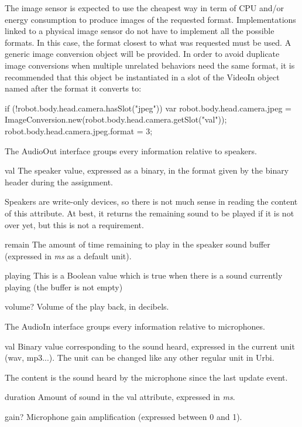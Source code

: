 The image sensor is expected to use the cheapest way in term of CPU and/or
energy consumption to produce images of the requested format.
Implementations linked to a physical image sensor do not have to implement
all the possible formats. In this case, the format closest to what was
requested must be used.  A generic image conversion object will be
provided. In order to avoid duplicate image conversions when multiple
unrelated behaviors need the same format, it is recommended that this object
be instantiated in a slot of the VideoIn object named after the format it
converts to:
\begin{urbiunchecked}
if (!robot.body.head.camera.hasSlot("jpeg"))
{
  var robot.body.head.camera.jpeg =
    ImageConversion.new(robot.body.head.camera.getSlot("val"));
  robot.body.head.camera.jpeg.format = 3;
}
\end{urbiunchecked}

The AudioOut interface groups every information relative to speakers.

\begin{urbiscriptapi}
\item[val] The speaker value, expressed as a binary, in the format given by
  the binary header during the assignment.

  Speakers are write-only devices, so there is not much sense in reading the
  content of this attribute. At best, it returns the remaining sound to be
  played if it is not over yet, but this is not a requirement.


\item[remain] The amount of time remaining to play in the speaker sound
  buffer (expressed in \textit{ms} as a default unit).


\item[playing] This is a Boolean value which is true when there is a sound
  currently playing (the buffer is not empty)%

\item[volume?] Volume of the play back, in decibels.
\end{urbiscriptapi}




The AudioIn interface groups every information relative to microphones.

\begin{urbiscriptapi}
\item[val] Binary value corresponding to the sound heard, expressed in the
  current unit (wav, mp3...). The unit can be changed like any other regular
  unit in Urbi.

  The content is the sound heard by the microphone since the last update
  event.
\item[duration] Amount of sound in the val attribute, expressed in
  \textit{ms}.
\item[gain?] Microphone gain amplification (expressed between 0 and 1).
\end{urbiscriptapi}


